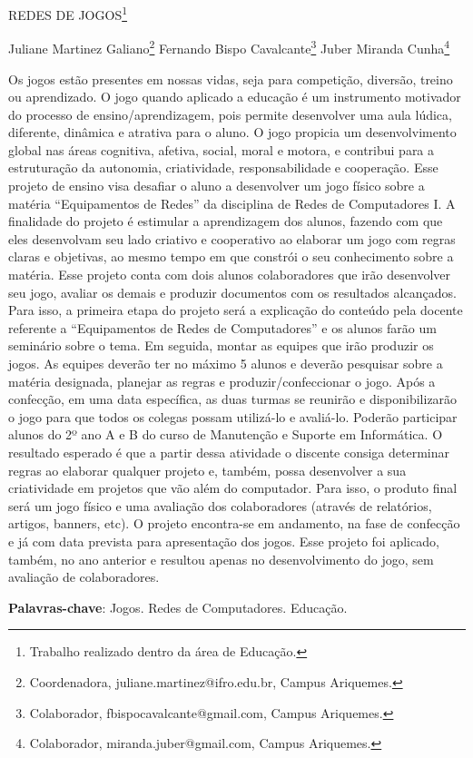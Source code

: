 \documentclass[article,12pt,onesidea,4paper,english,brazil]{abntex2}
\begin{document}
	
	
	\frenchspacing 
	
	\begin{center}
		\LARGE REDES DE JOGOS\footnote{Trabalho realizado dentro da área de Educação.}
		
		\normalsize
	Juliane Martinez Galiano\footnote{Coordenadora, juliane.martinez@ifro.edu.br, Campus Ariquemes.} 
	Fernando Bispo Cavalcante\footnote{Colaborador, fbispocavalcante@gmail.com, Campus Ariquemes.} 
	Juber Miranda Cunha\footnote{Colaborador, miranda.juber@gmail.com, Campus Ariquemes.} 
	\end{center}
	
	\noindent Os jogos estão presentes em nossas vidas, seja para competição, diversão, treino
	ou aprendizado. O jogo quando aplicado a educação é um instrumento motivador do
	processo de ensino/aprendizagem, pois permite desenvolver uma aula lúdica,
	diferente, dinâmica e atrativa para o aluno. O jogo propicia um desenvolvimento
	global nas áreas cognitiva, afetiva, social, moral e motora, e contribui para a
	estruturação da autonomia, criatividade, responsabilidade e cooperação. Esse
	projeto de ensino visa desafiar o aluno a desenvolver um jogo físico sobre a matéria
	“Equipamentos de Redes” da disciplina de Redes de Computadores I. A finalidade
	do projeto é estimular a aprendizagem dos alunos, fazendo com que eles
	desenvolvam seu lado criativo e cooperativo ao elaborar um jogo com regras claras
	e objetivas, ao mesmo tempo em que constrói o seu conhecimento sobre a matéria.
	Esse projeto conta com dois alunos colaboradores que irão desenvolver seu jogo,
	avaliar os demais e produzir documentos com os resultados alcançados. Para isso,
	a primeira etapa do projeto será a explicação do conteúdo pela docente referente a
	“Equipamentos de Redes de Computadores” e os alunos farão um seminário sobre o
	tema. Em seguida, montar as equipes que irão produzir os jogos. As equipes
	deverão ter no máximo 5 alunos e deverão pesquisar sobre a matéria designada,
	planejar as regras e produzir/confeccionar o jogo. Após a confecção, em uma data
	específica, as duas turmas se reunirão e disponibilizarão o jogo para que todos os
	colegas possam utilizá-lo e avaliá-lo. Poderão participar alunos do 2º ano A e B do
	curso de Manutenção e Suporte em Informática. O resultado esperado é que a partir
	dessa atividade o discente consiga determinar regras ao elaborar qualquer projeto e,
	também, possa desenvolver a sua criatividade em projetos que vão além do
	computador. Para isso, o produto final será um jogo físico e uma avaliação dos
	colaboradores (através de relatórios, artigos, banners, etc). O projeto encontra-se
	em andamento, na fase de confecção e já com data prevista para apresentação dos
	jogos. Esse projeto foi aplicado, também, no ano anterior e resultou apenas no
	desenvolvimento do jogo, sem avaliação de colaboradores.
	
	\vspace{\onelineskip}
	
	\noindent
	\textbf{Palavras-chave}: Jogos. Redes de Computadores. Educação.
	
\end{document}
